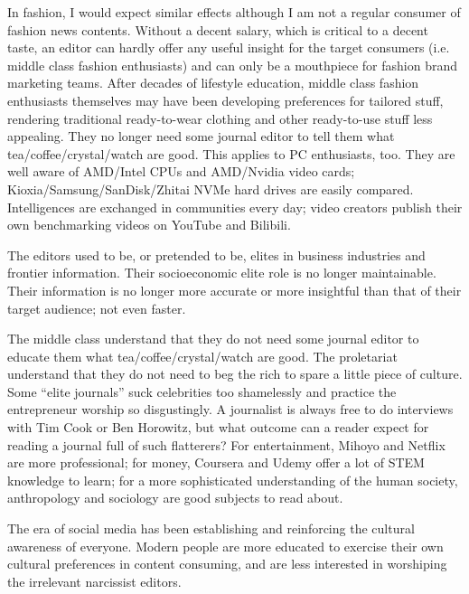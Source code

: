 In fashion, I would expect similar effects although I am not a regular consumer of fashion news contents.
Without a decent salary, which is critical to a decent taste,
an editor can hardly offer any useful insight for the target consumers (i.e. middle class fashion enthusiasts)
and can only be a mouthpiece for fashion brand marketing teams.
After decades of lifestyle education, middle class fashion enthusiasts themselves
may have been developing preferences for tailored stuff,
rendering traditional ready-to-wear clothing and other ready-to-use stuff less appealing.
They no longer need some journal editor to tell them what tea/coffee/crystal/watch are good.
This applies to PC enthusiasts, too.
They are well aware of AMD/Intel CPUs and AMD/Nvidia video cards;
Kioxia/Samsung/SanDisk/Zhitai NVMe hard drives are easily compared.
Intelligences are exchanged in communities every day;
video creators publish their own benchmarking videos on YouTube and Bilibili.

The editors used to be, or pretended to be,
elites in business industries and frontier information.
Their socioeconomic elite role is no longer maintainable.
Their information is no longer more accurate or more insightful than that of their target audience;
not even faster.


The middle class understand that they do not need some journal editor to educate them
what tea/coffee/crystal/watch are good.
The proletariat understand that they do not need to beg the rich to spare a little piece of culture.
Some ``elite journals'' suck celebrities too shamelessly and practice the entrepreneur worship so disgustingly.
A journalist is always free to do interviews with Tim Cook or Ben Horowitz,
but what outcome can a reader expect for reading a journal full of such flatterers?
For entertainment, Mihoyo and Netflix are more professional;
for money, Coursera and Udemy offer a lot of STEM knowledge to learn;
for a more sophisticated understanding of the human society, anthropology and sociology are good subjects to read about.

The era of social media has been establishing and reinforcing the cultural awareness of everyone.
Modern people are more educated to exercise their own cultural preferences in content consuming,
and are less interested in worshiping the irrelevant narcissist editors.

